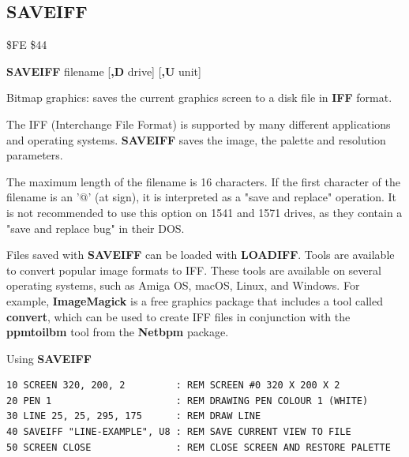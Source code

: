 \subsection{SAVEIFF}
\begin{description}[leftmargin=2cm,style=nextline]
\item [Token:]    \$FE \$44

\item [Format:]   {\bf SAVEIFF} filename [{\bf,D} drive] [{\bf,U} unit]

\item [Usage:]    Bitmap graphics: saves the current graphics screen to a disk file in {\bf IFF} format.

                  The IFF (Interchange File Format) is supported by many different applications and operating systems. {\bf SAVEIFF} saves the image, the palette and resolution parameters.

                  \filenamedefinition The maximum length of the filename is 16 characters. If the first character of the filename is an '@' (at sign), it is interpreted as a "save and replace" operation. It is not recommended to use this option on 1541 and 1571 drives, as they contain a "save and replace bug" in their DOS.

                  \drivedefinition

                  \unitdefinition

\item [Remarks:]  Files saved with {\bf SAVEIFF} can be loaded with {\bf LOADIFF}. Tools are available to convert popular image formats to IFF. These tools are available on several operating systems, such as Amiga OS, macOS, Linux, and Windows. For example, {\bf ImageMagick} is a free graphics package that includes a tool called {\bf convert}, which can be used to create IFF files in conjunction with the {\bf ppmtoilbm} tool from the {\bf Netbpm} package.

\item [Example:]  Using {\bf SAVEIFF}

\begin{tcolorbox}[colback=black,coltext=white]
\verbatimfont{\codefont}
\begin{verbatim}
10 SCREEN 320, 200, 2         : REM SCREEN #0 320 X 200 X 2
20 PEN 1                      : REM DRAWING PEN COLOUR 1 (WHITE)
30 LINE 25, 25, 295, 175      : REM DRAW LINE
40 SAVEIFF "LINE-EXAMPLE", U8 : REM SAVE CURRENT VIEW TO FILE
50 SCREEN CLOSE               : REM CLOSE SCREEN AND RESTORE PALETTE
\end{verbatim}
\end{tcolorbox}
\end{description}

